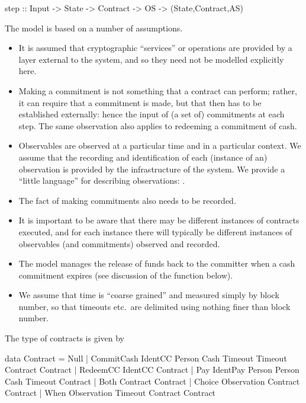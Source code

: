 \documentclass[
      acmsmall
    , screen
    , review=true
  ]{acmart}
\begin{document}
\begin{haskellcode}
step :: Input -> State -> Contract -> OS -> (State,Contract,AS)
\end{haskellcode}

The model is based on a number of assumptions.

\begin{itemize}
\item It is assumed that cryptographic ``services'' or operations are provided by a layer external to the system, and so they need not be modelled explicitly here.
\item Making a commitment is not something that a contract can perform; rather, it can require that a commitment is made, but that then has to be established externally: hence the input of (a set of) commitments at each step. The same observation also applies to redeeming a commitment of cash.
\item Observables are observed at a particular time and in a particular context. We assume that the recording and identification of each (instance of an) observation is provided by the infrastructure of the system. We provide a ``little language'' for describing observations: .
\item The fact of making commitments also needs to be recorded.
\item It is important to be aware that there may be different instances of contracts executed, and for each instance there will typically be different instances of observables (and commitments) observed and recorded.
\item The model manages the release of funds back to the committer when a cash commitment expires (see discussion of the  function below).
\item We assume that time is ``coarse grained'' and measured simply by block number, so that timeouts etc.\ are delimited using nothing finer than block number. 
\end{itemize}

\medskip
\noindent
The type of contracts is given by

\begin{haskellcode}
data Contract =
   Null |
   CommitCash IdentCC Person Cash Timeout Timeout Contract Contract |  
   RedeemCC IdentCC Contract |
   Pay IdentPay Person Person Cash Timeout Contract |  
   Both Contract Contract |
   Choice Observation Contract Contract |
   When Observation Timeout Contract Contract   
   \end{haskellcode}
\end{document}
